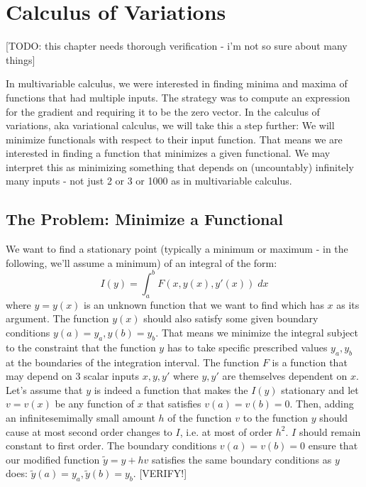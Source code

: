 \section{Calculus of Variations} 

[TODO: this chapter needs thorough verification - i'm not so sure about many things]

In multivariable calculus, we were interested in finding minima and maxima of functions that had multiple inputs. The strategy was to compute an expression for the gradient and requiring it to be the zero vector. In the calculus of variations, aka variational calculus, we will take this a step further: We will minimize functionals with respect to their input function. That means we are interested in finding a function that minimizes a given functional. We may interpret this as minimizing something that depends on (uncountably) infinitely many inputs - not just 2 or 3 or 1000 as in multivariable calculus.


\subsection{The Problem: Minimize a Functional}
We want to find a stationary point (typically a minimum or maximum - in the following, we'll assume a minimum) of an integral of the form:
\begin{equation}
 I(y) = \int_a^b F(x,y(x),y'(x)) \; dx
\end{equation}
where $y = y(x)$ is an unknown function that we want to find which has $x$ as its argument. The function $y(x)$ should also satisfy some given boundary conditions $y(a) = y_a, y(b) = y_b$. That means we minimize the integral subject to the constraint that the function $y$ has to take specific prescribed values $y_a, y_b$ at the boundaries of the integration interval. The function $F$ is a function that may depend on 3 scalar inputs $x,y,y'$ where $y,y'$ are themselves dependent on $x$. Let's assume that $y$ is indeed a function that makes the $I(y)$ stationary and let $v = v(x)$ be any function of $x$ that satisfies $v(a) = v(b) = 0$. Then, adding an infinitesemimally small amount $h$ of the function $v$ to the function $y$ should cause at most second order changes to $I$, i.e. at most of order $h^2$. $I$ should remain constant to first order. The boundary conditions $v(a) = v(b) = 0$ ensure that our modified function $\tilde{y} = y + h v$ satisfies the same boundary conditions as $y$ does: $\tilde{y}(a) = y_a, \tilde{y}(b) = y_b$. [VERIFY!]

